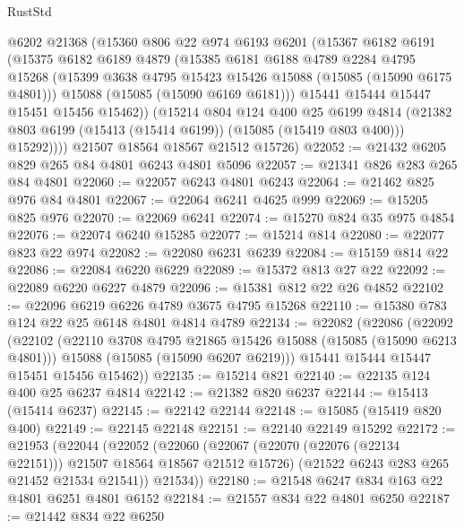 \begin{lexlean}{RustStd}
\begin{coremodule}
          @6202
          @21368
          (@15360
            @806
            @22
            @974
            @6193
            @6201
            (@15367
              @6182
              @6191
              (@15375
                @6182
                @6189
                @4879
                (@15385
                  @6181
                  @6188
                  @4789
                  @2284
                  @4795
                  @15268
                  (@15399 @3638 @4795 @15423 @15426 @15088 (@15085 (@15090 @6175 @4801)))
                  @15088
                  (@15085 (@15090 @6169 @6181)))
                @15441
                @15444
                @15447
                @15451
                @15456
                @15462))
            (@15214
              @804
              @124
              @400
              @25
              @6199
              @4814
              (@21382 @803 @6199 (@15413 (@15414 @6199)) (@15085 (@15419 @803 @400)))
              @15292))))
      @21507
      @18564
      @18567
      @21512
      @15726)
@22052 := @21432 @6205 @829 @265 @84 @4801 @6243 @4801 @5096
@22057 := @21341 @826 @283 @265 @84 @4801
@22060 := @22057 @6243 @4801 @6243
@22064 := @21462 @825 @976 @84 @4801
@22067 := @22064 @6241 @4625 @999
@22069 := @15205 @825 @976
@22070 := @22069 @6241
@22074 := @15270 @824 @35 @975 @4854
@22076 := @22074 @6240 @15285
@22077 := @15214 @814
@22080 := @22077 @823 @22 @974
@22082 := @22080 @6231 @6239
@22084 := @15159 @814 @22
@22086 := @22084 @6220 @6229
@22089 := @15372 @813 @27 @22
@22092 := @22089 @6220 @6227 @4879
@22096 := @15381 @812 @22 @26 @4852
@22102 := @22096 @6219 @6226 @4789 @3675 @4795 @15268
@22110 := @15380 @783 @124 @22 @25 @6148 @4801 @4814 @4789
@22134 := @22082
    (@22086
      (@22092
        (@22102
          (@22110 @3708 @4795 @21865 @15426 @15088 (@15085 (@15090 @6213 @4801)))
          @15088
          (@15085 (@15090 @6207 @6219)))
        @15441
        @15444
        @15447
        @15451
        @15456
        @15462))
@22135 := @15214 @821
@22140 := @22135 @124 @400 @25 @6237 @4814
@22142 := @21382 @820 @6237
@22144 := @15413 (@15414 @6237)
@22145 := @22142 @22144
@22148 := @15085 (@15419 @820 @400)
@22149 := @22145 @22148
@22151 := @22140 @22149 @15292
@22172 := @21953
    (@22044
      (@22052
        (@22060
          (@22067 (@22070 (@22076 (@22134 @22151))) @21507 @18564 @18567 @21512 @15726)
          (@21522 @6243 @283 @265 @21452 @21534 @21541))
        @21534))
@22180 := @21548 @6247 @834 @163 @22 @4801 @6251 @4801 @6152
@22184 := @21557 @834 @22 @4801 @6250
@22187 := @21442 @834 @22 @6250

\end{coremodule}
\end{lexlean}
